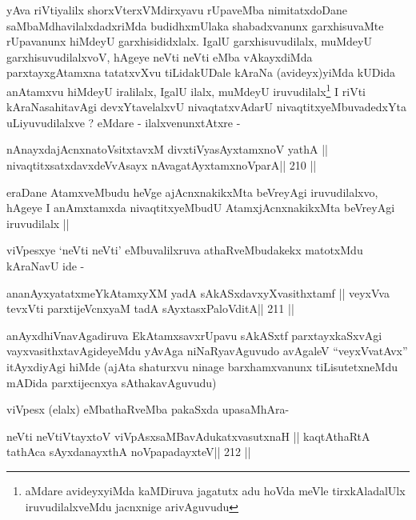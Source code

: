 \begin{artha}
yAva riVtiyalilx shorxVterxVMdirxyavu rUpaveMba nimitatxdoDane
saMbaMdhavilalxdadxriMda budidhxmUlaka shabadxvanunx garxhisuvaMte
rUpavanunx hiMdeyU garxhisididxlalx. IgalU garxhisuvudilalx, muMdeyU
garxhisuvudilalxvoV, hAgeye neVti neVti eMba vAkayxdiMda
parxtayxgAtamxna tatatxvXvu tiLidakUDale kAraNa (avideyx)yiMda kUDida
anAtamxvu hiMdeyU iralilalx, IgalU ilalx, muMdeyU
iruvudilalx\footnote[1]{aMdare avideyxyiMda kaMDiruva jagatutx adu
  hoVda meVle tirxkAladalUlx iruvudilalxveMdu jacnxnige arivAguvudu}
I riVti kAraNasahitavAgi devxYtavelalxvU nivaqtatxvAdarU
nivaqtitxyeMbuvadedxYta uLiyuvudilalxve ? eMdare - ilalxvenunxtAtxre -
\end{artha}

\begin{shl}
nAnayxdajAcnxnatoV\s sitxtavxM divxtiVyasAyx\s\s tamxnoV yathA ||
nivaqtitxsatxdavxdeVvAsayx nAvagatAyxtamxnoV\s parA\hfill || 210 ||
\end{shl}

\begin{artha}
eraDane AtamxveMbudu heVge ajAcnxnakikxMta beVreyAgi iruvudilalxvo,
hAgeye I anAmxtamxda nivaqtitxyeMbudU AtamxjAcnxnakikxMta beVreyAgi
iruvudilalx ||
\end{artha}

\begin{artha}
viVpesxye `neVti neVti' eMbuvalilxruva athaRveMbudakekx matotxMdu
kAraNavU ide -
\end{artha}

\begin{shl}
ananAyxyatatxmeYkAtamxyXM yadA sAkASxdavxyXvasithxtamf ||
veyxVva tevxVti parxtijeVcnxyaM tadA sAyxtasxPaloVditA\hfill || 211 ||
\end{shl}

\begin{artha}
anAyxdhiVnavAgadiruva EkAtamxsavxrUpavu sAkASxtf parxtayxkaSxvAgi
vayxvasithxtavAgideyeMdu yAvAga niNaRyavAguvudo avAgaleV
``veyxVvatAvx'' itAyxdiyAgi hiMde (ajAta shaturxvu ninage
barxhamxvanunx tiLisutetxneMdu mADida parxtijecnxya sAthakavAguvudu)
\end{artha}

\begin{artha}
viVpesx (elalx) eMbathaRveMba pakaSxda upasaMhAra-
\end{artha}

\begin{shl}
neVti neVtiVtayxtoV viVpAsxsaMBavAdukatxvasutxnaH ||
kaqtAthaRtA tathAca sAyxdanayxthA noVpapadayxteV\hfill || 212 ||
\end{shl}

